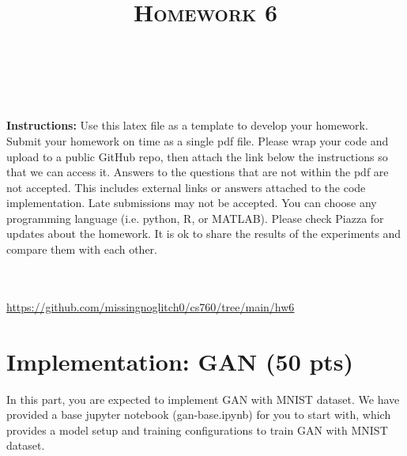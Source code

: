 \documentclass[a4paper]{article}
\title{\textsc{Homework 6}} %
\author{
	\red{$>>$Martin Diges$<<$} \\
	\red{$>>$9080689699$<<$}\\
}
\date{}
\theoremstyle{definition}
\begin{document}
	
	\maketitle 
	
        \textbf{Instructions:}
        Use this latex file as a template to develop your homework. Submit your homework on time as a single pdf file. Please wrap your code and upload to a public GitHub repo, then attach the link below the instructions so that we can access it. Answers to the questions that are not within the pdf are not accepted. This includes external links or answers attached to the code implementation. Late submissions may not be accepted. You can choose any programming language (i.e. python, R, or MATLAB). Please check Piazza for updates about the homework. It is ok to share the results of the experiments and compare them with each other.
        \vspace{0.1in}

        \\\\
        \hypersetup{colorlinks=true, linkcolor=cyan}
        \url{https://github.com/missingnoglitch0/cs760/tree/main/hw6}
	
	\section{Implementation: GAN (50 pts)}
	In this part, you are expected to implement GAN with MNIST dataset. We have provided a base jupyter notebook (gan-base.ipynb) for you to start with, which provides a model setup and training configurations to train GAN with MNIST dataset.
	
\end{document}
